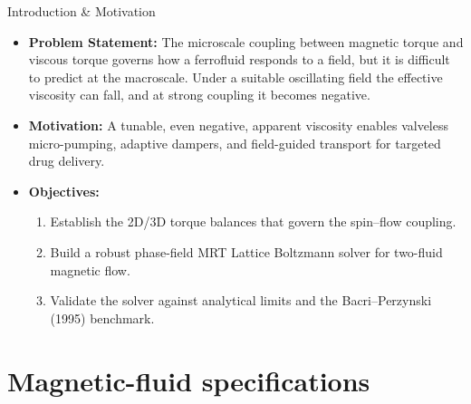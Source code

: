 \documentclass[aspectratio=43,10pt]{beamer}
\begin{document}
\begin{frame}{Introduction \& Motivation}
  \begin{itemize}
    \item \textbf{Problem Statement:} The microscale coupling between magnetic torque and viscous torque governs how a ferrofluid responds to a field, but it is difficult to predict at the macroscale. Under a suitable oscillating field the effective viscosity can fall, and at strong coupling it becomes negative.
    \item \textbf{Motivation:} A tunable, even negative, apparent viscosity enables valveless micro-pumping, adaptive dampers, and field-guided transport for targeted drug delivery.
    \item \textbf{Objectives:}
      \begin{enumerate}
        \item Establish the 2D/3D torque balances that govern the spin--flow coupling.
        \item Build a robust phase-field MRT Lattice Boltzmann solver for two-fluid magnetic flow.
        \item Validate the solver against analytical limits and the Bacri--Perzynski (1995) benchmark.
      \end{enumerate}
  \end{itemize}
\end{frame}

\section{Magnetic-fluid specifications}
\end{document}
